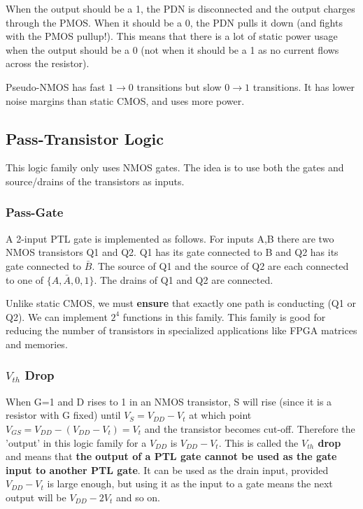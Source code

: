 \documentclass[11pt]{report}
\begin{document}
When the output should be a 1, the PDN is disconnected and the output charges through the PMOS. When it should be a 0, the PDN pulls it down (and fights with the PMOS pullup!). This means that there is a lot of static power usage when the output should be a 0 (not when it should be a 1 as no current flows across the resistor).

Pseudo-NMOS has fast $1\xrightarrow{}0$ transitions but slow $0 \xrightarrow{}1$ transitions. It has lower noise margins than static CMOS, and uses more power.


\subsection{Pass-Transistor Logic}\label{sec:pass-transistor-logic}
This logic family only uses NMOS gates. The idea is to use both the gates and source/drains of the transistors as inputs.

\subsubsection{Pass-Gate}
A 2-input PTL gate is implemented as follows. For inputs A,B there are two NMOS transistors Q1 and Q2. Q1 has its gate connected to B and Q2 has its gate connected to $\bar{B}$. The source of Q1 and the source of Q2 are each connected to one of $\{A, \bar{A}, 0, 1\}$. The drains of Q1 and Q2 are connected.

Unlike static CMOS, we must \textbf{ensure} that exactly one path is conducting (Q1 or Q2). We can implement $2^4$ functions in this family. This family is good for reducing the number of transistors in specialized applications like FPGA matrices and memories.

\subsubsection{$V_{th}$ Drop}
When G=1 and D rises to 1 in an NMOS transistor, S will rise (since it is a resistor with G fixed) until $V_S = V_{DD} - V_t$ at which point $V_{GS} = V_{DD} - (V_{DD} - V_t) = V_t$ and the transistor becomes cut-off. Therefore the 'output' in this logic family for a $V_{DD}$ is $V_{DD} - V_t$. This is called the \textbf{$V_{th}$ drop} and means that \textbf{the output of a PTL gate cannot be used as the gate input to another PTL gate}. It can be used as the drain input, provided $V_{DD}-V_{t}$ is large enough, but using it as the input to a gate means the next output will be $V_{DD} - 2V_{t}$ and so on.
\end{document}
